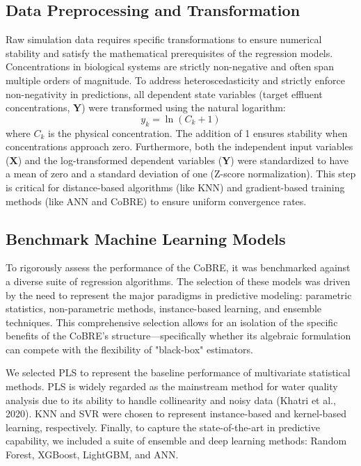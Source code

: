 \documentclass{article}
\begin{document}
\subsection{Data Preprocessing and Transformation}
Raw simulation data requires specific transformations to ensure numerical stability and satisfy the mathematical prerequisites of the regression models. Concentrations in biological systems are strictly non-negative and often span multiple orders of magnitude. To address heteroscedasticity and strictly enforce non-negativity in predictions, all dependent state variables (target effluent concentrations, $\mathbf{Y}$) were transformed using the natural logarithm:
\begin{equation}
y_{k} = \ln(C_{k} + 1)
\end{equation}
where $C_{k}$ is the physical concentration. The addition of 1 ensures stability when concentrations approach zero. Furthermore, both the independent input variables ($\mathbf{X}$) and the log-transformed dependent variables ($\mathbf{Y}$) were standardized to have a mean of zero and a standard deviation of one (Z-score normalization). This step is critical for distance-based algorithms (like KNN) and gradient-based training methods (like ANN and CoBRE) to ensure uniform convergence rates.

\subsection{Benchmark Machine Learning Models}
To rigorously assess the performance of the CoBRE, it was benchmarked against a diverse suite of regression algorithms. The selection of these models was driven by the need to represent the major paradigms in predictive modeling: parametric statistics, non-parametric methods, instance-based learning, and ensemble techniques. This comprehensive selection allows for an isolation of the specific benefits of the CoBRE's structure—specifically whether its algebraic formulation can compete with the flexibility of "black-box" estimators.

We selected PLS to represent the baseline performance of multivariate statistical methods. PLS is widely regarded as the mainstream method for water quality analysis due to its ability to handle collinearity and noisy data (Khatri et al., 2020). KNN and SVR were chosen to represent instance-based and kernel-based learning, respectively. Finally, to capture the state-of-the-art in predictive capability, we included a suite of ensemble and deep learning methods: Random Forest, XGBoost, LightGBM, and ANN.
\end{document}
